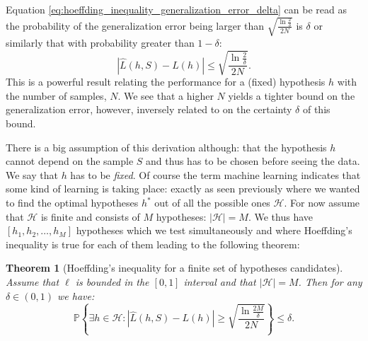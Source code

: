 \documentclass[a4paper, twoside, nobib]{tufte-book}
\newtheorem{theorem}{Theorem}
\begin{document}
Equation \eqref{eq:hoeffding_inequality_generalization_error_delta} can be read as the probability of the generalization error being larger than $\sqrt{\frac{\ln \frac{2}{\delta}}{2N}}$ is $\delta$ or similarly that with probability greater than $1-\delta$:
\begin{equation}
  \label{eq:hoeffding_inequality_single_PAC}
  \left| \hat{L}(h, S) - L(h) \right| \leq \sqrt{\frac{\ln \frac{2}{\delta}}{2N}}.
\end{equation}
This is a powerful result relating the performance for a (fixed) hypothesis $h$ with the number of samples, $N$. We see that a higher $N$ yields a tighter bound on the generalization error, however, inversely related to on the certainty $\delta$ of this bound. 

There is a big assumption of this derivation although: that the hypothesis $h$ cannot depend on the sample $S$ and thus has to be chosen before seeing the data. We say that $h$ has to be \emph{fixed}. Of course the term machine learning indicates that some kind of learning is taking place: exactly as seen previously where we wanted to find the optimal hypotheses $h^*$ out of all the possible ones $\mathcal{H}$. For now assume that $\mathcal{H}$ is finite and consists of $M$ hypotheses: $|\mathcal{H}| = M$. We thus have $[h_1, h_2, \dots, h_M]$ hypotheses which we test simultaneously and where Hoeffding's inequality is true for each of them leading to the following theorem:
\begin{theorem}[Hoeffding's inequality for a finite set of hypotheses candidates]
  \label{theorem:hoeffding_finite}
  Assume that $\ell$ is bounded in the $[0, 1]$ interval and that $|\mathcal{H}| = M$. Then for any $\delta\in(0,1)$ we have:  
  \begin{equation}
    \label{eq:hoeffding_inequality_theorem_multiple}
    \mathbb{P} \left\{ \exists h \in \mathcal{H}: \left| \hat{L}(h, S) - L(h) \right| \geq \sqrt{\frac{\ln \frac{2M}{\delta}}{2N}}  \right\} \leq \delta.
  \end{equation}
\end{theorem}
\end{document}
